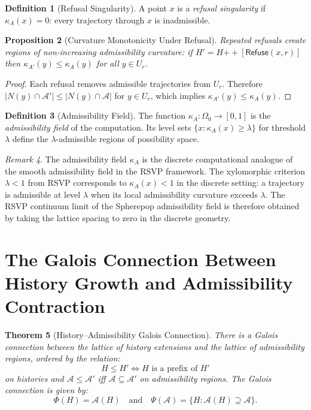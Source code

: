\documentclass[12pt, a4paper, openany]{book}
\theoremstyle{plain}
\newtheorem{theorem}{Theorem}[chapter]
\newtheorem{proposition}[theorem]{Proposition}
\theoremstyle{definition}
\newtheorem{definition}[theorem]{Definition}
\theoremstyle{remark}
\newtheorem{remark}[theorem]{Remark}
\newcommand{\Refuse}{\mathsf{Refuse}}
\newcommand{\calA}{\mathcal{A}}
\begin{document}
\begin{definition}[Refusal Singularity]
A point $x$ is a \emph{refusal singularity} if $\kappa_A(x) = 0$: every
trajectory through $x$ is inadmissible.
\end{definition}

\begin{proposition}[Curvature Monotonicity Under Refusal]
Repeated refusals create regions of non-increasing admissibility curvature:
if $H' = H \mathbin{++} [\Refuse(x, r)]$ then $\kappa_{A'}(y) \leq \kappa_A(y)$
for all $y \in U_r$.
\end{proposition}

\begin{proof}
Each refusal removes admissible trajectories from $U_r$. Therefore
$|N(y) \cap \calA'| \leq |N(y) \cap \calA|$ for $y \in U_r$, which implies
$\kappa_{A'}(y) \leq \kappa_A(y)$.
\end{proof}

\begin{definition}[Admissibility Field]
The function $\kappa_A : \Omega_0 \to [0,1]$ is the \emph{admissibility field}
of the computation. Its level sets $\{x : \kappa_A(x) \geq \lambda\}$ for
threshold $\lambda$ define the $\lambda$-admissible regions of possibility space.
\end{definition}

\begin{remark}
The admissibility field $\kappa_A$ is the discrete computational analogue of
the smooth admissibility field in the RSVP framework. The xylomorphic criterion
$\lambda < 1$ from RSVP corresponds to $\kappa_A(x) < 1$ in the discrete
setting: a trajectory is admissible at level $\lambda$ when its local admissibility
curvature exceeds $\lambda$. The RSVP continuum limit of the Spherepop admissibility
field is therefore obtained by taking the lattice spacing to zero in the discrete
geometry.
\end{remark}

\section{The Galois Connection Between History Growth and Admissibility Contraction}

\begin{theorem}[History--Admissibility Galois Connection]
There is a Galois connection between the lattice of history extensions and the
lattice of admissibility regions, ordered by the relation:
\[
H \leq H' \iff H \text{ is a prefix of } H'
\]
on histories and $\calA \leq \calA'$ iff $\calA \subseteq \calA'$ on admissibility
regions. The Galois connection is given by:
\[
\Phi(H) = \calA(H) \quad \text{and} \quad \Psi(\calA) = \{H : \calA(H) \supseteq \calA\}.
\]
\end{theorem}
\end{document}
